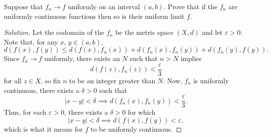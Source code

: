 \documentclass[11pt]{scrartcl}
\providecommand{\eps}{\varepsilon}
\newenvironment{soln}{\begin{proof}[Solution]}{\end{proof}}
\begin{document}
\begin{problem}
	Suppose that $f_n\to f$ uniformly on an interval $(a, b)$.
	Prove that if the $f_n$ are uniformly continuous functions
	then so is their uniform limit $f$.
\end{problem}

\begin{soln}
	Let the codomain of the $f_n$ be the metric space $(X, d)$
	and let $\eps > 0$.
	Note that, for any $x,\,y\in(a,b)$,
	\[d(f(x), f(y)) \le d(f(x), f_n(x)) + d(f_n(x), f_n(y)) + d(f_n(y), f(y)).\]
	Since $f_n\to f$ uniformly, there exists an $N$ such that
	$n > N$ implies
	\[d(f(z), f_n(z)) < \frac\eps3\]
	for all $z\in X$, so fix $n$ to be an integer greater than $N$.
	Now, $f_n$ is uniformly continuous, there exists a $\delta > 0$ such that
	\[|x - y| < \delta \implies d(f_n(x), f_n(y)) < \frac\eps3.\]
	Thus, for each $\eps > 0$, there exists a $\delta > 0$ for which
	\[|x - y| < \delta \implies d(f(x), f(y)) < \eps,\]
	which is what it means for $f$ to be uniformly continuous.
\end{soln}
\end{document}
